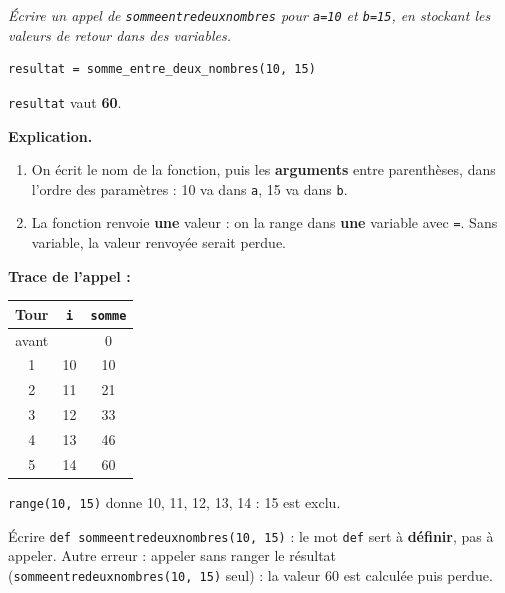 \documentclass[addpoints, 11pt]{exam}
\newcommand{\enonce}[1]{\textit{#1}\par\smallskip}
\newcommand{\explication}{\par\smallskip\noindent\textbf{Explication.}\ }
\newcommand{\code}[1]{\texttt{#1}}
\DeclareRobustCommand{\_}{\textunderscore\allowbreak}
\begin{document}
\begin{questions}
\question[2] \enonce{Écrire un appel de \code{somme\_entre\_deux\_nombres} pour \code{a=10} et \code{b=15}, en stockant les valeurs de retour dans des variables.}
\begin{reponse}
\begin{lstlisting}
resultat = somme_entre_deux_nombres(10, 15)
\end{lstlisting}
\code{resultat} vaut \textbf{60}.
\end{reponse}
\explication
\begin{enumerate}
  \item On écrit le nom de la fonction, puis les \textbf{arguments} entre parenthèses, dans l'ordre des paramètres : 10 va dans \code{a}, 15 va dans \code{b}.
  \item La fonction renvoie \textbf{une} valeur : on la range dans \textbf{une} variable avec \code{=}. Sans variable, la valeur renvoyée serait perdue.
\end{enumerate}
\textbf{Trace de l'appel :}
\begin{center}
\begin{tabular}{|c|c|c|}
\hline
Tour & \code{i} & \code{somme} \\ \hline
avant & & 0 \\
1 & 10 & 10 \\
2 & 11 & 21 \\
3 & 12 & 33 \\
4 & 13 & 46 \\
5 & 14 & 60 \\ \hline
\end{tabular}
\end{center}
\code{range(10, 15)} donne 10, 11, 12, 13, 14 : 15 est exclu.
\begin{erreur}
Écrire \code{def somme\_entre\_deux\_nombres(10, 15)} : le mot \code{def} sert à \textbf{définir}, pas à appeler. Autre erreur : appeler sans ranger le résultat (\code{somme\_entre\_deux\_nombres(10, 15)} seul) : la valeur 60 est calculée puis perdue.
\end{erreur}


\end{questions}
\end{document}
